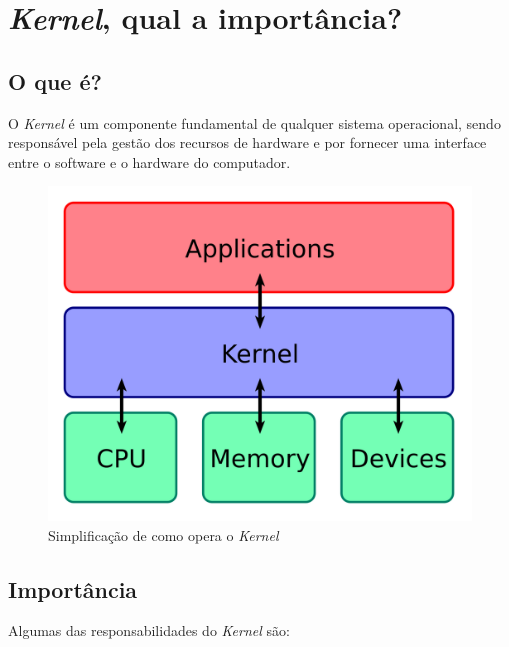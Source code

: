 \section{\textit{Kernel}, qual a importância?} \label{section: kernel}

\subsection{O que é?}
O \textit{Kernel} é um componente fundamental de qualquer sistema operacional, sendo responsável pela gestão dos recursos de hardware e por fornecer uma interface entre o software e o hardware do computador. \cite{kernel}

\begin{figure}[H]
  \centering
  \includegraphics[scale=0.2]{Figures/0. General/kernel.png}
  \caption{Simplificação de como opera o \textit{Kernel}}
  \label{Simplificação da operação do Kernel}
\end{figure}

\subsection{Importância}
Algumas das responsabilidades do \textit{Kernel} são:

